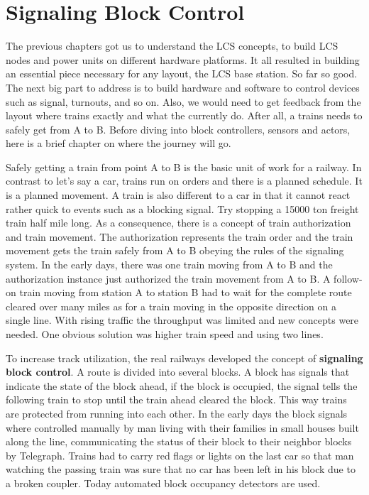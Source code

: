 \chapter{Signaling Block Control}

The previous chapters got us to understand the LCS concepts, to build LCS nodes and power units on different hardware platforms. It all resulted in building an essential piece necessary for any layout, the LCS base station. So far so good. The next big part to address is to build hardware and software to control devices such as signal, turnouts, and so on. Also, we would need to get feedback from the layout where trains exactly and what the currently do. After all, a trains needs to safely get from A to B. Before diving into block controllers, sensors and actors, here is a brief chapter on where the journey will go.

Safely getting a train from point A to B is the basic unit of work for a railway. In contrast to let's say a car, trains run on orders and there is a planned schedule. It is a planned movement. A train is also different to a car in that it cannot react rather quick to events such as a blocking signal. Try stopping a 15000 ton freight train half mile long. As a consequence, there is a concept of train authorization and train movement. The authorization represents the train order and the train movement gets the train safely from A to B obeying the rules of the signaling system. In the early days, there was one train moving from A to B and the authorization instance just authorized the train movement from A to B. A follow-on train moving from station A to station B had to wait for the complete route cleared over many miles as for a train moving in the opposite direction on a single line. With rising traffic the throughput was limited and new concepts were needed. One obvious solution was higher train speed and using two lines.

To increase track utilization, the real railways developed the concept of \textbf{signaling block control}. A route is divided into several blocks. A block has signals that indicate the state of the block ahead, if the block is occupied, the signal tells the following train to stop until the train ahead cleared the block. This way trains are protected from running into each other. In the early days the block signals where controlled manually by man living with their families in small houses built along the line, communicating the status of their block to their neighbor blocks by Telegraph. Trains had to carry red flags or lights on the last car so that man watching the passing train was sure that no car has been left in his block due to a broken coupler. Today automated block occupancy detectors are used.

